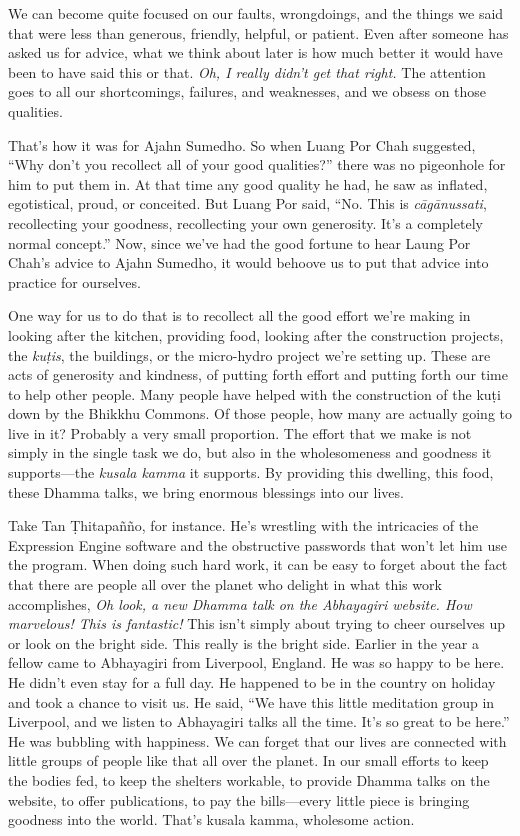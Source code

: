 We can become quite focused on our faults, wrongdoings, and the things 
we said that were less than generous, friendly, helpful, or patient. 
Even after someone has asked us for advice, what we think about later 
is how much better it would have been to have said this or that. 
\emph{Oh, I really didn't get that right.} The attention goes to all 
our shortcomings, failures, and weaknesses, and we obsess on those 
qualities.

That's how it was for Ajahn Sumedho. So when Luang Por Chah suggested, 
``Why don't you recollect all of your good qualities?'' there was no 
pigeonhole for him to put them in. At that time any good quality he 
had, he saw as inflated, egotistical, proud, or conceited. But Luang 
Por said, ``No. This is \emph{cāgānussati}, recollecting your 
goodness, recollecting your own generosity. It's a completely normal 
concept.'' Now, since we've had the good fortune to hear Laung Por 
Chah's advice to Ajahn Sumedho, it would behoove us to put that advice 
into practice for ourselves.

One way for us to do that is to recollect all the good effort we're 
making in looking after the kitchen, providing food, looking after the 
construction projects, the \emph{kuṭis}, the buildings, or the 
micro-hydro project we're setting up. These are acts of generosity and 
kindness, of putting forth effort and putting forth our time to help 
other people. Many people have helped with the construction of the 
kuṭi down by the Bhikkhu Commons. Of those people, how many are 
actually going to live in it? Probably a very small proportion. The 
effort that we make is not simply in the single task we do, but also in 
the wholesomeness and goodness it supports---the \emph{kusala kamma} it 
supports. By providing this dwelling, this food, these Dhamma talks, we 
bring enormous blessings into our lives.

Take Tan Ṭhitapañño, for instance. He's wrestling with the 
intricacies of the Expression Engine software and the obstructive 
passwords that won't let him use the program. When doing such hard 
work, it can be easy to forget about the fact that there are people all 
over the planet who delight in what this work accomplishes, \emph{Oh 
look, a new Dhamma talk on the Abhayagiri website. How marvelous! This 
is fantastic!} This isn't simply about trying to cheer ourselves up or 
look on the bright side. This really is the bright side. Earlier in the 
year a fellow came to Abhayagiri from Liverpool, England. He was so 
happy to be here. He didn't even stay for a full day. He happened to be 
in the country on holiday and took a chance to visit us. He said, ``We 
have this little meditation group in Liverpool, and we listen to 
Abhayagiri talks all the time. It's so great to be here.'' He was 
bubbling with happiness. We can forget that our lives are connected 
with little groups of people like that all over the planet. In our 
small efforts to keep the bodies fed, to keep the shelters workable, to 
provide Dhamma talks on the website, to offer publications, to pay the 
bills---every little piece is bringing goodness into the world. That's 
kusala kamma, wholesome action.

